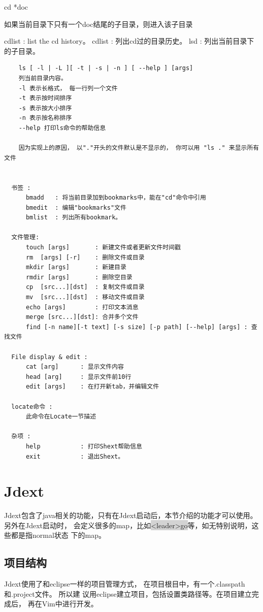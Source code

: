 \documentclass[oneside,openany]{book}
\begin{document}
    \begin{mdframed}[style=SmallFrame] cd *doc \end{mdframed}
    \vspace{0.1mm}
     如果当前目录下只有一个doc结尾的子目录，则进入该子目录

    cdlist   : list the cd history。
    \newline
    cdlist   : 列出cd过的目录历史。
    \newline
    lsd      : 列出当前目录下的子目录。

  \begin{verbatim}
    ls [ -l | -L ][ -t | -s | -n ] [ --help ] [args] 
    列当前目录内容。 
    -l 表示长格式， 每一行列一个文件
    -t 表示按时间排序
    -s 表示按大小排序
    -n 表示按名称排序
    --help 打印ls命令的帮助信息

    因为实现上的原因， 以"."开头的文件默认是不显示的， 你可以用 "ls ." 来显示所有文件


  书签 :
      bmadd   : 将当前目录加到bookmarks中，能在"cd"命令中引用
      bmedit  : 编辑"bookmarks"文件
      bmlist  : 列出所有bookmark。

  文件管理:
      touch [args]       : 新建文件或者更新文件时间戳
      rm  [args] [-r]    : 删除文件或目录
      mkdir [args]       : 新建目录
      rmdir [args]       : 删除空目录
      cp  [src...][dst]  : 复制文件或目录
      mv  [src...][dst]  : 移动文件或目录
      echo [args]        : 打印文本消息
      merge [src...][dst]: 合并多个文件
      find [-n name][-t text] [-s size] [-p path] [--help] [args] : 查找文件

  File display & edit :
      cat [arg]      : 显示文件内容
      head [arg]     : 显示文件前10行
      edit [args]    : 在打开新tab，并编辑文件

  locate命令 :
      此命令在Locate一节描述

  杂项 :
      help           : 打印Shext帮助信息
      exit           : 退出Shext。
  \end{verbatim}

\section{Jdext}
  Jdext包含了java相关的功能，只有在Jdext启动后，本节介绍的功能才可以使用。另外在Jdext启动时，
会定义很多的map，比如\colorbox{lightgray}{<leader>go}等，如无特别说明，这些都是指normal状态
下的map。

\subsection{项目结构}
    Jdext使用了和eclipse一样的项目管理方式， 在项目根目中，有一个.classpath和.project文件。 所以建
议用eclipse建立项目，包括设置类路径等。在项目建立完成后， 再在Vim中进行开发。
\end{document}
